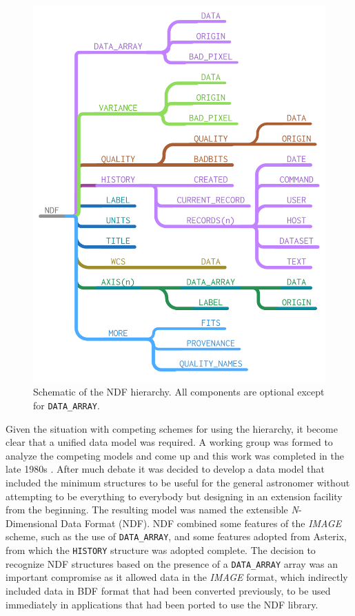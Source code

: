 \documentclass[final,authoryear,5p,times,twocolumn]{elsarticle}
\begin{document}
\begin{figure}[t]
\includegraphics[width=\columnwidth]{NDF-structure}
\caption{Schematic of the NDF hierarchy. All components are optional
  except for \texttt{DATA\_ARRAY}.}
\label{fig:ndf-structure}
\end{figure}

Given the situation with competing schemes for using the hierarchy, it
become clear that a unified data model was required. A working group
was formed to analyze the competing models and come up and this work
was completed in the late 1980s \citep{1988STARB...2...11C,SGP38}.
After much debate it was decided to develop a data model that included
the minimum structures to be useful for the general astronomer without
attempting to be everything to everybody but designing in an extension
facility from the beginning. The resulting model was named the
extensible \emph{N}-Dimensional Data Format (NDF).  NDF combined some
features of the \emph{IMAGE} scheme, such as the use of
\texttt{DATA\_ARRAY}, and some features adopted from Asterix, from
which the \texttt{HISTORY} structure was adopted complete.  The
decision to recognize NDF structures based on the presence of a
\texttt{DATA\_ARRAY} array was an important compromise as it allowed
data in the \emph{IMAGE} format, which indirectly included data in
BDF format that had been converted previously, to be used immediately
in applications that had been ported to use the NDF library.
\end{document}
